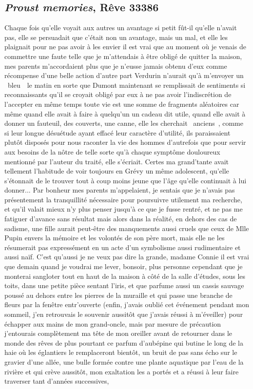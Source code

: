 \documentclass{article}
\begin{document}
		\subsection{\textit{Proust memories}, Rêve 33386}\label{proust_memories_texte}
			Chaque fois qu'elle voyait aux autres un avantage si petit fût-il qu'elle n'avait pas, elle se persuadait que c'était non un avantage, mais un mal, et elle les plaignait pour ne pas avoir à les envier il est vrai que au moment où je venais de commettre une faute telle que je m'attendais à être obligé de quitter la maison, mes parents m'accordaient plus que je n'eusse jamais obtenu d'eux comme récompense d'une belle action d'autre part Verdurin n'aurait qu'à m'envoyer un \guillemotleft~bleu~\guillemotright~le matin en sorte que Dumont maintenant se remplissait de sentiments si reconnaissants qu'il se croyait obligé par eux à ne pas avoir l'indiscrétion de l'accepter en même temps toute vie est une somme de fragments aléatoires car même quand elle avait à faire à quelqu'un un cadeau dit utile, quand elle avait à donner un fauteuil, des couverts, une canne, elle les cherchait \guillemotleft~anciens~\guillemotright, comme si leur longue désuétude ayant effacé leur caractère d'utilité, ils paraissaient plutôt disposés pour nous raconter la vie des hommes d'autrefois que pour servir aux besoins de la nôtre de telle sorte qu'à chaque symptôme douloureux mentionné par l'auteur du traité, elle s'écriait. Certes ma grand'tante avait tellement l'habitude de voir toujours en Grévy un même adolescent, qu'elle s'étonnait de le trouver tout à coup moins jeune que l'âge qu'elle continuait à lui donner... Par bonheur mes parents m'appelaient, je sentais que je n'avais pas présentement la tranquillité nécessaire pour poursuivre utilement ma recherche, et qu'il valait mieux n'y plus penser jusqu'à ce que je fusse rentré, et ne pas me fatiguer d'avance sans résultat mais alors dans la réalité, en dehors des cas de sadisme, une fille aurait peut-être des manquements aussi cruels que ceux de Mlle Pupin envers la mémoire et les volontés de son père mort, mais elle ne les résumerait pas expressément en un acte d'un symbolisme aussi rudimentaire et aussi naïf. C'est qu'aussi je ne veux pas dire la grande, madame Connie il est vrai que demain quand je voudrai me lever, bonsoir, plus personne cependant que je monterai sangloter tout en haut de la maison à côté de la salle d'études, sous les toits, dans une petite pièce sentant l'iris, et que parfume aussi un cassis sauvage poussé au dehors entre les pierres de la muraille et qui passe une branche de fleurs par la fenêtre entr'ouverte (enfin, j'avais oublié cet événement pendant mon sommeil, j'en retrouvais le souvenir aussitôt que j'avais réussi à m'éveiller) pour échapper aux mains de mon grand-oncle, mais par mesure de précaution j'entourais complètement ma tête de mon oreiller avant de retourner dans le monde des rêves de plus pourtant ce parfum d'aubépine qui butine le long de la haie où les églantiers le remplaceront bientôt, un bruit de pas sans écho sur le gravier d'une allée, une bulle formée contre une plante aquatique par l'eau de la rivière et qui crève aussitôt, mon exaltation les a portés et a réussi à leur faire traverser tant d'années successives, 
\end{document}
